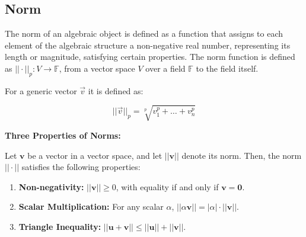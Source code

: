 \subsection{Norm}
The norm of an algebraic object is defined as a function that assigns to each element of the algebraic structure a non-negative real number, representing its length or magnitude, satisfying certain properties. The norm function is defined as $||\cdot||_p: V \rightarrow \mathbb F$, from a vector space $V$ over a field $\mathbb F$ to the field itself.

For a generic vector $\vec v $ it is defined as:

$$
||\vec v||_p = \sqrt[p]{v_1^p + \dots + v_n^p}
$$

\textbf{Three Properties of Norms:}

Let $\mathbf{v}$ be a vector in a vector space, and let $||\mathbf{v}||$ denote its norm. Then, the norm $||\cdot||$ satisfies the following properties:

\begin{enumerate}
    \item \textbf{Non-negativity:} $||\mathbf{v}|| \geq 0$, with equality if and only if $\mathbf{v} = \mathbf{0}$.
    
    \item \textbf{Scalar Multiplication:} For any scalar $\alpha$, $||\alpha \mathbf{v}|| = |\alpha| \cdot ||\mathbf{v}||$.
    
    \item \textbf{Triangle Inequality:} $||\mathbf{u} + \mathbf{v}|| \leq ||\mathbf{u}|| + ||\mathbf{v}||$.
\end{enumerate}